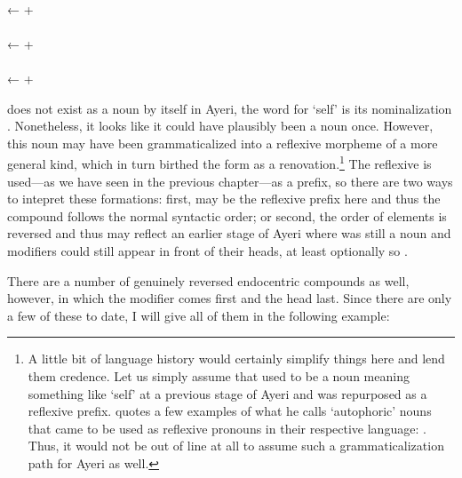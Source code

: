 \pex
	\a {} \\
		← 
		+  \\

	\a {} \\
		← 
		+  \\
		
	\a {} \\
		← 
		+ 
\xe

 does not exist as a noun by itself in Ayeri, the word for 
`self' is its nominalization . Nonetheless, it looks 
like it could have plausibly been a noun once. However, this noun 
may have been grammaticalized into a reflexive morpheme of a more 
general kind, which in turn birthed the form  as a 
renovation.\footnote{A little bit of language history would certainly simplify 
things here and lend them credence. Let us simply assume that 
 used to be a noun meaning something like `self' at a 
previous stage of Ayeri and was repurposed as a reflexive prefix. 
\citet{lehmann2015} quotes a few examples of what he calls `autophoric' nouns 
that came to be used as reflexive pronouns in their respective language: 
. Thus, it would not be out of
line at all to assume such a grammaticalization path for Ayeri as well.} The
reflexive  is used---as we have seen in the previous
chapter---as a prefix, so there are two ways to intepret these formations:
first,  may be the reflexive prefix here and thus the
compound follows the normal syntactic order; or second, the order of elements
is reversed and thus may reflect an earlier stage of Ayeri where
 was still a noun and modifiers could still appear in front
of their heads, at least optionally so \citep[133--137]{gaeta2008}.

There are a number of genuinely reversed endocentric compounds as well, 
however, in which the modifier comes first and the head last. Since there are 
only a few of these to date, I will give all of them in the following example:

